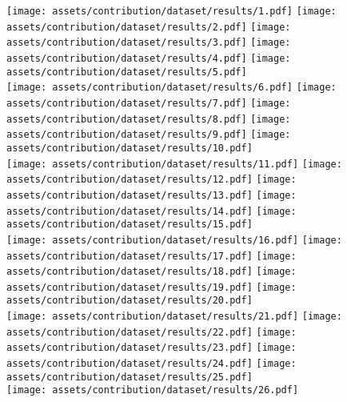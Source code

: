 \documentclass[a4paper, 12pt]{report}
\begin{document}
\begin{figure}
\centering
\vspace{20pt}
\texttt{[image: assets/contribution/dataset/results/1.pdf]}\hfill
\texttt{[image: assets/contribution/dataset/results/2.pdf]}\hfill
\texttt{[image: assets/contribution/dataset/results/3.pdf]}\hfill
\texttt{[image: assets/contribution/dataset/results/4.pdf]}\hfill
\texttt{[image: assets/contribution/dataset/results/5.pdf]}
\\[\smallskipamount]
\texttt{[image: assets/contribution/dataset/results/6.pdf]}\hfill
\texttt{[image: assets/contribution/dataset/results/7.pdf]}\hfill
\texttt{[image: assets/contribution/dataset/results/8.pdf]}\hfill
\texttt{[image: assets/contribution/dataset/results/9.pdf]}\hfill
\texttt{[image: assets/contribution/dataset/results/10.pdf]}
\\[\smallskipamount]
\texttt{[image: assets/contribution/dataset/results/11.pdf]}\hfill
\texttt{[image: assets/contribution/dataset/results/12.pdf]}\hfill
\texttt{[image: assets/contribution/dataset/results/13.pdf]}\hfill
\texttt{[image: assets/contribution/dataset/results/14.pdf]}\hfill
\texttt{[image: assets/contribution/dataset/results/15.pdf]}
\\[\smallskipamount]
\texttt{[image: assets/contribution/dataset/results/16.pdf]}\hfill
\texttt{[image: assets/contribution/dataset/results/17.pdf]}\hfill
\texttt{[image: assets/contribution/dataset/results/18.pdf]}\hfill
\texttt{[image: assets/contribution/dataset/results/19.pdf]}\hfill
\texttt{[image: assets/contribution/dataset/results/20.pdf]}
\\[\smallskipamount]
\texttt{[image: assets/contribution/dataset/results/21.pdf]}\hfill
\texttt{[image: assets/contribution/dataset/results/22.pdf]}\hfill
\texttt{[image: assets/contribution/dataset/results/23.pdf]}\hfill
\texttt{[image: assets/contribution/dataset/results/24.pdf]}\hfill
\texttt{[image: assets/contribution/dataset/results/25.pdf]}
\\[\smallskipamount]
\texttt{[image: assets/contribution/dataset/results/26.pdf]}\hfill

\end{figure}
\end{document}
